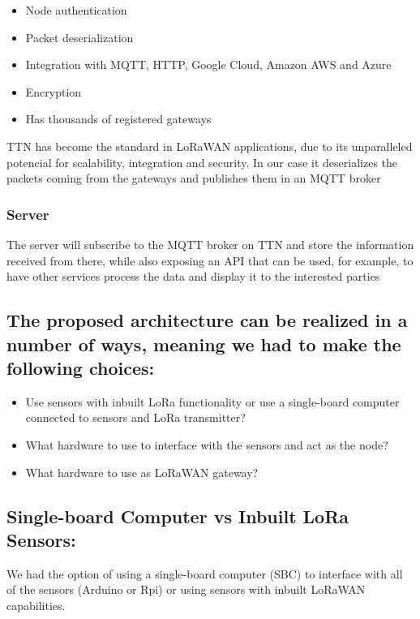 \begin{itemize}
	\item Node authentication
	\item Packet deserialization
	\item Integration with MQTT, HTTP, Google Cloud, Amazon AWS and Azure
	\item Encryption
	\item Has thousands of registered gateways
\end{itemize}

TTN has become the standard in LoRaWAN applications, due to its unparalleled potencial for scalability, integration and security. In our case it deserializes the packets coming from the gateways and publishes them in an MQTT broker 

\subsubsection{Server}
The server will subscribe to the MQTT broker on TTN and store the information received from there, while also exposing an API that can be used, for example, to have other services process the data and display it to the interested parties


\subsection{The proposed architecture can be realized in a number of ways, meaning we had to make the following choices:}
\begin{itemize}
	\item Use sensors with inbuilt LoRa functionality or use a single-board computer connected to sensors and LoRa transmitter?
	\item What hardware to use to interface with the sensors and act as the node?
	\item What hardware to use as LoRaWAN gateway?
\end{itemize}



\subsection{Single-board Computer vs Inbuilt LoRa Sensors:}

We had the option of using a single-board computer (SBC) to interface with all of the sensors (Arduino or Rpi) or using sensors with inbuilt LoRaWAN capabilities.

